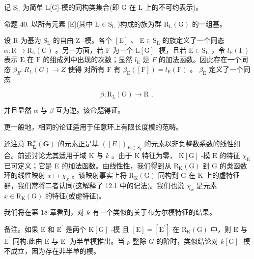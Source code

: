 \documentclass[10pt]{article}
\begin{document}
记 \({\mathrm{S}}_{\mathrm{L}}\) 为简单 L[G]-模的同构类集合(即 \(\mathrm{G}\) 在 \(\mathrm{L}\) 上的不可约表示)。

命题 40. 以所有元素 [E](其中 \(\mathrm{E} \in  {\mathrm{S}}_{\mathrm{L}}\) )构成的族为群 \({\mathrm{R}}_{\mathrm{L}}\left( \mathrm{G}\right)\) 的一组基。

设 \(\mathrm{R}\) 为基为 \({\mathrm{S}}_{\mathrm{L}}\) 的自由 \(\mathrm{Z}\) -模。各个 \(\left\lbrack  \mathrm{E}\right\rbrack\) 、 \(\mathrm{E} \in  {\mathrm{S}}_{\mathrm{L}}\) 的族定义了一个同态 \(\alpha  : \mathrm{R} \rightarrow  {\mathrm{R}}_{\mathrm{L}}\left( \mathrm{G}\right)\) 。另一方面，若 \(\mathrm{F}\) 为一个 \(\mathrm{L}\left\lbrack  \mathrm{G}\right\rbrack\) -模，且若 \(\mathrm{E} \in  {\mathrm{S}}_{\mathrm{L}}\) ，令 \({l}_{\mathrm{E}}\left( \mathrm{F}\right)\) 表示 \(\mathrm{E}\) 在 \(\mathrm{F}\) 的组成列中出现的次数；显然 \({l}_{\mathrm{E}}\) 是 \(F\) 的加法函数。因此存在一个同态 \({\beta }_{E} : {R}_{L}\left( G\right)  \rightarrow  Z\) 使得 对所有 \(\mathrm{F}\) 有 \({\beta }_{\mathrm{E}}\left( \left\lbrack  \mathrm{F}\right\rbrack  \right)  = {l}_{\mathrm{E}}\left( \mathrm{F}\right)\) 。 \({\beta }_{\mathrm{E}}\) 定义了一个同态

\[
\beta  : {\mathrm{R}}_{\mathrm{L}}\left( \mathrm{G}\right)  \rightarrow  \mathrm{R}\text{ , }
\]

并且显然 \(\alpha\) 与 \(\beta\) 互为逆。该命题得证。

更一般地，相同的论证适用于任意环上有限长度模的范畴。

还注意 \({\mathbf{R}}_{\mathbf{L}}^{ + }\left( \mathbf{G}\right)\) 的元素正是基 \({\left( \left\lbrack  E\right\rbrack  \right) }_{E \in  {S}_{I}}\) 的元素以非负整数系数的线性组合。前述讨论尤其适用于域 \(\mathrm{K}\) 与 \(k\) 。由于 \(\mathrm{K}\) 特征为零， \(\mathrm{K}\left\lbrack  \mathrm{G}\right\rbrack\) -模 \(\mathrm{E}\) 的特征 \({\chi }_{\mathrm{E}}\) 已可定义；它是 E 的加法函数。由线性性，我们得到从 \({\mathrm{R}}_{\mathrm{K}}\left( \mathrm{G}\right)\) 到 \(\mathrm{G}\) 的类函数环的线性映射 \(x \mapsto  {\chi }_{x}\) 。该映射事实上将 \({\mathrm{R}}_{\mathrm{K}}\left( \mathrm{G}\right)\) 同构到 \(\mathrm{G}\) 在 K 上的虚特征群，我们常将二者认同(这解释了 12.1 中的记法)。我们也说 \({\chi }_{x}\) 是元素 \(x \in  {\mathrm{R}}_{\mathrm{K}}\left( \mathrm{G}\right)\) 的特征(或虚特征)。

我们将在第 18 章看到，对 \(k\) 有一个类似的关于布劳尔模特征的结果。

备注。如果 \(\mathrm{E}\) 和 \({\mathrm{E}}^{\prime }\) 是两个 \(\mathrm{K}\left\lbrack  \mathrm{G}\right\rbrack\) -模 且 \(\left\lbrack  \mathrm{E}\right\rbrack   = \left\lbrack  {\mathrm{E}}^{\prime }\right\rbrack\) 在 \({\mathrm{R}}_{\mathrm{K}}\left( \mathrm{G}\right)\) 中，则 \(\mathrm{E}\) 与 \({\mathrm{E}}^{\prime }\) 同构:此由 \(\mathrm{E}\) 与 \({\mathrm{E}}^{\prime }\) 为半单模推出。当 \(p\) 整除 \(G\) 的阶时，类似结论对 \(k\left\lbrack  \mathrm{G}\right\rbrack\) -模 不成立，因为存在非半单的模。
\end{document}
